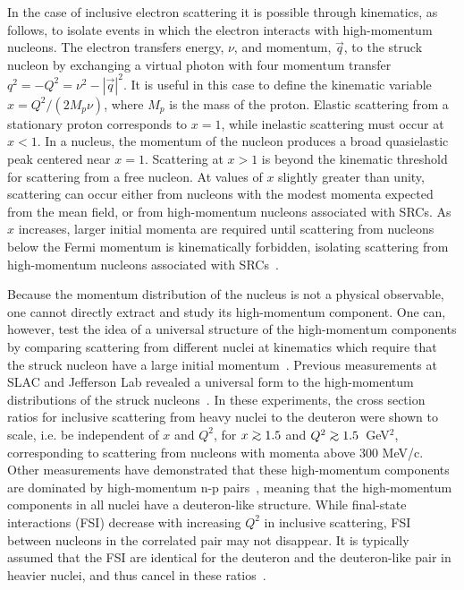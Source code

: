 In the case of inclusive electron scattering it is possible  through kinematics, as follows, to isolate events in which the electron interacts with  high-momentum nucleons. The electron transfers energy, $\nu$, and momentum, $\vec{q}$, to the struck nucleon by exchanging
a virtual photon with four momentum transfer $q^2 = - Q^{2} = \nu^{2}-|\vec{q}|^{2}$. It is useful in this
case to define the kinematic variable $x = Q^2/(2M_p\nu)$, where $M_p$ is the mass of the proton. Elastic
scattering from a stationary proton corresponds to $x=1$, while inelastic scattering must occur at $x<1$. In
a nucleus, the momentum of the nucleon produces a broad quasielastic peak centered near $x=1$. 
Scattering at $x>1$ is beyond the kinematic threshold for scattering from a free nucleon. At values of $x$ slightly greater than unity, scattering can occur either from nucleons with the modest momenta expected from the mean field, or from high-momentum nucleons associated with SRCs. As $x$
increases, larger initial momenta are required until scattering from nucleons below the Fermi
momentum is kinematically forbidden, isolating scattering from high-momentum nucleons associated with
SRCs~\cite{RevModPhys.80.189, PhysRevC.53.1689, src_john, egiyan2003}.

Because the momentum distribution of the nucleus is not a physical observable, one cannot directly extract
and study its high-momentum component. One can, however, test the idea of a universal structure of the
high-momentum components by comparing scattering from different nuclei at kinematics which require that the
struck nucleon have a large initial momentum~\cite{RevModPhys.80.189}. Previous measurements at SLAC and
Jefferson Lab revealed a universal form to the high-momentum distributions of the struck
nucleons~\cite{SLAC_Measurement_PRC.48.2451, egiyan2003, PhysRevLett.96.082501, fomin2012, src_john,
arrington99, arrington01}. In these experiments, the cross section ratios for inclusive scattering from
heavy nuclei to the deuteron were shown to scale, i.e. be independent of $x$ and $Q^2$, for $x \gtorder 1.5$
and $Q^2 \gtorder 1.5$~GeV$^2$, corresponding to scattering from nucleons with momenta above 300 MeV/c.
Other measurements have demonstrated that these high-momentum components are dominated by high-momentum n-p
pairs~\cite{aclander99, tang03, Subedi13062008, korover2014, hen14_science, piasetzky06}, meaning that the high-momentum
components in all nuclei have a deuteron-like structure. While final-state interactions (FSI)
decrease with increasing $Q^2$ in inclusive scattering, FSI between nucleons in the correlated pair may not
disappear. It is typically assumed that the FSI are identical for the deuteron and the deuteron-like pair in
heavier nuclei, and thus cancel in these ratios~\cite{RevModPhys.80.189, src_john}.

